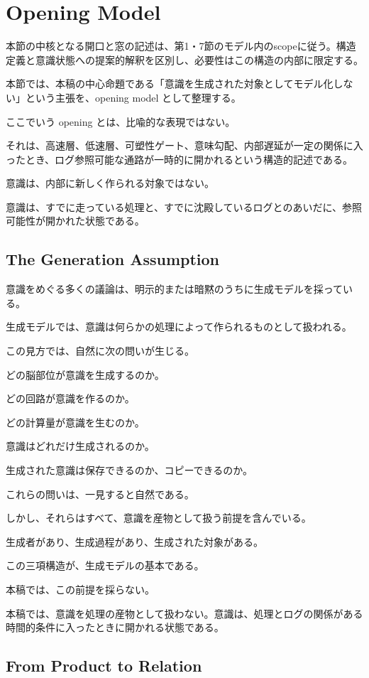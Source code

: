 \section{Opening Model}

本節の中核となる開口と窓の記述は、第1・7節のモデル内のscopeに従う。構造定義と意識状態への提案的解釈を区別し、必要性はこの構造の内部に限定する。


本節では、本稿の中心命題である「意識を生成された対象としてモデル化しない」という主張を、opening model として整理する。

ここでいう opening とは、比喩的な表現ではない。

それは、高速層、低速層、可塑性ゲート、意味勾配、内部遅延が一定の関係に入ったとき、ログ参照可能な通路が一時的に開かれるという構造的記述である。

意識は、内部に新しく作られる対象ではない。

意識は、すでに走っている処理と、すでに沈殿しているログとのあいだに、参照可能性が開かれた状態である。

\subsection{The Generation Assumption}

意識をめぐる多くの議論は、明示的または暗黙のうちに生成モデルを採っている。

生成モデルでは、意識は何らかの処理によって作られるものとして扱われる。

この見方では、自然に次の問いが生じる。

どの脳部位が意識を生成するのか。

どの回路が意識を作るのか。

どの計算量が意識を生むのか。

意識はどれだけ生成されるのか。

生成された意識は保存できるのか、コピーできるのか。

これらの問いは、一見すると自然である。

しかし、それらはすべて、意識を産物として扱う前提を含んでいる。

生成者があり、生成過程があり、生成された対象がある。

この三項構造が、生成モデルの基本である。

本稿では、この前提を採らない。

本稿では、意識を処理の産物として扱わない。意識は、処理とログの関係がある時間的条件に入ったときに開かれる状態である。

\subsection{From Product to Relation}

